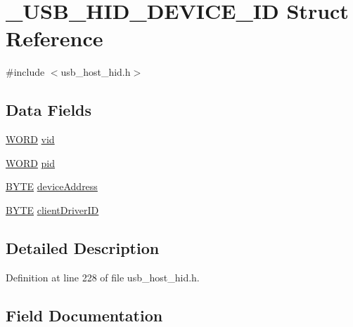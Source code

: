 \hypertarget{struct___u_s_b___h_i_d___d_e_v_i_c_e___i_d}{}\section{\+\_\+\+U\+S\+B\+\_\+\+H\+I\+D\+\_\+\+D\+E\+V\+I\+C\+E\+\_\+\+I\+D Struct Reference}
\label{struct___u_s_b___h_i_d___d_e_v_i_c_e___i_d}


{\ttfamily \#include $<$usb\+\_\+host\+\_\+hid.\+h$>$}

\subsection*{Data Fields}
\begin{DoxyCompactItemize}
\item 
\hyperlink{_generic_type_defs_8h_a2b0e863dadf920709ec53d9088ee7c91}{W\+O\+R\+D} \hyperlink{struct___u_s_b___h_i_d___d_e_v_i_c_e___i_d_a9fcc011b7b6427b55322964f2d01781f}{vid}
\item 
\hyperlink{_generic_type_defs_8h_a2b0e863dadf920709ec53d9088ee7c91}{W\+O\+R\+D} \hyperlink{struct___u_s_b___h_i_d___d_e_v_i_c_e___i_d_a718a3b94d880d84d1532ae6411eb60cc}{pid}
\item 
\hyperlink{_generic_type_defs_8h_a4ae1dab0fb4b072a66584546209e7d58}{B\+Y\+T\+E} \hyperlink{struct___u_s_b___h_i_d___d_e_v_i_c_e___i_d_aa1d659071a17ee8d0172d34d6783b517}{device\+Address}
\item 
\hyperlink{_generic_type_defs_8h_a4ae1dab0fb4b072a66584546209e7d58}{B\+Y\+T\+E} \hyperlink{struct___u_s_b___h_i_d___d_e_v_i_c_e___i_d_a343912ad63712ea60903f5acd92efc9e}{client\+Driver\+I\+D}
\end{DoxyCompactItemize}


\subsection{Detailed Description}


Definition at line 228 of file usb\+\_\+host\+\_\+hid.\+h.



\subsection{Field Documentation}
\hypertarget{struct___u_s_b___h_i_d___d_e_v_i_c_e___i_d_a343912ad63712ea60903f5acd92efc9e}{}
